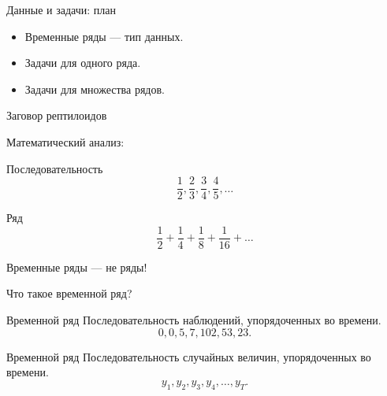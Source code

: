 
\begin{frame} %


\end{frame}



\begin{frame}{Данные и задачи: план}
  \begin{itemize}[<+->]
    \item Временные ряды — тип данных.
    \item Задачи для одного ряда.
    \item Задачи для множества рядов. 
  \end{itemize}

\end{frame}


\begin{frame}{Заговор рептилоидов}

  \alert{Математический анализ:}

  \begin{block}{Последовательность}
    \[
      \frac{1}{2}, \frac{2}{3}, \frac{3}{4}, \frac{4}{5}, \ldots
    \]
  \end{block}
  
  \pause

  \begin{block}{Ряд}
    \[
      \frac{1}{2} + \frac{1}{4} + \frac{1}{8} +  \frac{1}{16} + \ldots
    \]
  \end{block}
  
  \pause

  Временные ряды — \alert{не ряды!}
\end{frame}
  



\begin{frame}{Что такое временной ряд?}

\begin{block}{Временной ряд}
Последовательность наблюдений, упорядоченных во времени. 
\[
0, 0, 5, 7, 102, 53, 23. 
\]
\end{block}

\pause
\begin{block}{Временной ряд}
Последовательность случайных величин, упорядоченных во времени. 
\[
y_1, y_2, y_3, y_4, \ldots, y_T.
\]
\end{block}
  

\end{frame}


